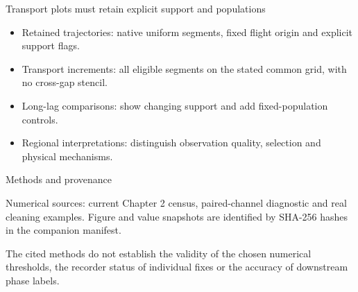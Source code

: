 \documentclass[11pt,aspectratio=169]{beamer}
\begin{document}
\begin{frame}{Transport plots must retain explicit support and populations}
\small
\begin{itemize}
\item Retained trajectories: native uniform segments, fixed flight origin and explicit support flags.
\item Transport increments: all eligible segments on the stated common grid, with no cross-gap stencil.
\item Long-lag comparisons: show changing support and add fixed-population controls.
\item Regional interpretations: distinguish observation quality, selection and physical mechanisms.
\end{itemize}
\end{frame}

\begin{frame}{Methods and provenance}
\small
{}
\par\medskip
Numerical sources: current Chapter 2 census, paired-channel diagnostic and real cleaning examples. Figure and value snapshots are identified by SHA-256 hashes in the companion manifest.\par\medskip
The cited methods do not establish the validity of the chosen numerical thresholds, the recorder status of individual fixes or the accuracy of downstream phase labels.
\end{frame}
\end{document}
